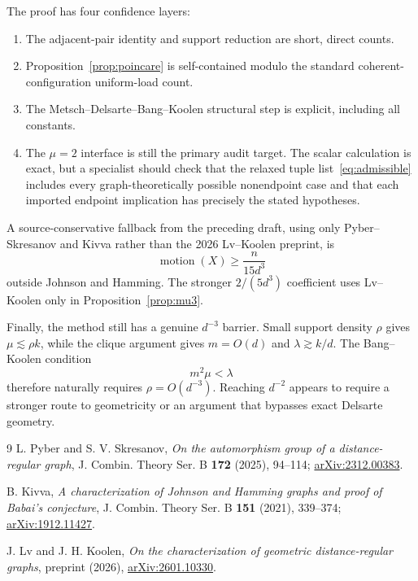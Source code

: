 \documentclass[11pt]{amsart}
\theoremstyle{definition}
\newcommand{\mot}{\operatorname{motion}}
\begin{document}
The proof has four confidence layers:
\begin{enumerate}[leftmargin=2.2em,itemsep=0.35em]
\item The adjacent-pair identity and support reduction are short, direct counts.
\item Proposition~\ref{prop:poincare} is self-contained modulo the standard coherent-configuration uniform-load count.
\item The Metsch--Delsarte--Bang--Koolen structural step is explicit, including all constants.
\item The $\mu=2$ interface is still the primary audit target.  The scalar calculation is exact, but a specialist should check that the relaxed tuple list~\eqref{eq:admissible} includes every graph-theoretically possible nonendpoint case and that each imported endpoint implication has precisely the stated hypotheses.
\end{enumerate}

A source-conservative fallback from the preceding draft, using only Pyber--Skresanov and Kivva rather than the 2026 Lv--Koolen preprint, is
\[
 \mot(X)\ge\frac{n}{15d^3}
\]
outside Johnson and Hamming.  The stronger $2/(5d^3)$ coefficient uses Lv--Koolen only in Proposition~\ref{prop:mu3}.

Finally, the method still has a genuine $d^{-3}$ barrier.  Small support density $\rho$ gives $\mu\lesssim\rho k$, while the clique argument gives $m=O(d)$ and $\lambda\gtrsim k/d$.  The Bang--Koolen condition
\[
 m^2\mu<\lambda
\]
therefore naturally requires $\rho=O(d^{-3})$.  Reaching $d^{-2}$ appears to require a stronger route to geometricity or an argument that bypasses exact Delsarte geometry.

\begin{thebibliography}{9}
L. Pyber and S. V. Skresanov,
\emph{On the automorphism group of a distance-regular graph},
J. Combin. Theory Ser. B \textbf{172} (2025), 94--114;
\href{https://arxiv.org/abs/2312.00383}{arXiv:2312.00383}.

B. Kivva,
\emph{A characterization of Johnson and Hamming graphs and proof of Babai's conjecture},
J. Combin. Theory Ser. B \textbf{151} (2021), 339--374;
\href{https://arxiv.org/abs/1912.11427}{arXiv:1912.11427}.

J. Lv and J. H. Koolen,
\emph{On the characterization of geometric distance-regular graphs},
preprint (2026),
\href{https://arxiv.org/abs/2601.10330}{arXiv:2601.10330}.
\end{thebibliography}
\end{document}
